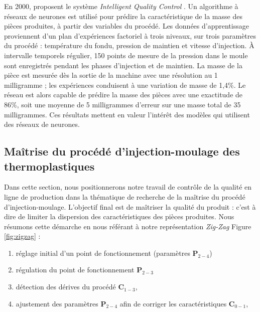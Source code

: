 
En 2000, \citeauthor{schnerr-haselbarth_automation_2000} proposent le système \textit{Intelligent Quality Control} \cite{schnerr-haselbarth_automation_2000}.
Un algorithme à réseaux de neurones est utilisé pour prédire la caractéristique de la masse des pièces produites, à partir des variables du procédé.
Les données d’apprentissage proviennent d’un plan d'expériences factoriel à trois niveaux, sur trois paramètres du procédé : température du fondu, pression de maintien et vitesse d’injection.
À intervalle temporels régulier, 150 points de mesure de la pression dans le moule sont enregistrés pendant les phases d’injection et de maintien.
La masse de la pièce est mesurée dès la sortie de la machine avec une résolution au 1 milligramme ; les expériences conduisent à une variation de masse de 1,4\%.
Le réseau est alors capable de prédire la masse des pièces avec une exactitude de 86\%, soit une moyenne de 5 milligrammes d’erreur sur une masse total de 35 milligrammes.
Ces résultats mettent en valeur l'intérêt des modèles qui utilisent des réseaux de neurones.

\subsection{Maîtrise du procédé d'injection-moulage des thermoplastiques} \label{subsec:process_control}
Dans cette section, nous positionnerons notre travail de contrôle de la qualité en ligne de production dans la thématique de recherche de la maîtrise du procédé d'injection-moulage.
L'objectif final est de maîtriser la qualité du produit : c'est à dire de limiter la dispersion des caractéristiques des pièces produites.
Nous résumons cette démarche en nous référant à notre représentation \textit{Zig-Zag} Figure \ref{fig:zigzag} :
\begin{enumerate}
	\item réglage initial d'un point de fonctionnement (paramètres $\boldsymbol{P}_{2-4}$)  %
	\item régulation du point de fonctionnement $\boldsymbol{P}_{2-3}$  %
	\item détection des dérives du procédé $\boldsymbol{C}_{1-3}$,
	\item ajustement des paramètres $\boldsymbol{P}_{2-4}$ afin de corriger les caractéristiques $\boldsymbol{C}_{0-1}$,
\end{enumerate}

